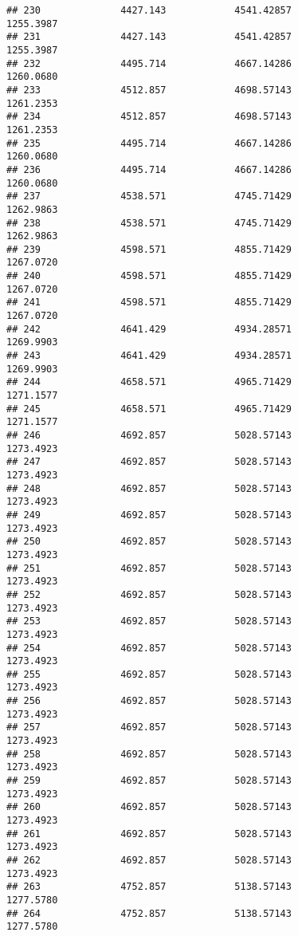 \documentclass[]{article}
\begin{document}
\begin{verbatim}
## 230              4427.143            4541.42857                1255.3987
## 231              4427.143            4541.42857                1255.3987
## 232              4495.714            4667.14286                1260.0680
## 233              4512.857            4698.57143                1261.2353
## 234              4512.857            4698.57143                1261.2353
## 235              4495.714            4667.14286                1260.0680
## 236              4495.714            4667.14286                1260.0680
## 237              4538.571            4745.71429                1262.9863
## 238              4538.571            4745.71429                1262.9863
## 239              4598.571            4855.71429                1267.0720
## 240              4598.571            4855.71429                1267.0720
## 241              4598.571            4855.71429                1267.0720
## 242              4641.429            4934.28571                1269.9903
## 243              4641.429            4934.28571                1269.9903
## 244              4658.571            4965.71429                1271.1577
## 245              4658.571            4965.71429                1271.1577
## 246              4692.857            5028.57143                1273.4923
## 247              4692.857            5028.57143                1273.4923
## 248              4692.857            5028.57143                1273.4923
## 249              4692.857            5028.57143                1273.4923
## 250              4692.857            5028.57143                1273.4923
## 251              4692.857            5028.57143                1273.4923
## 252              4692.857            5028.57143                1273.4923
## 253              4692.857            5028.57143                1273.4923
## 254              4692.857            5028.57143                1273.4923
## 255              4692.857            5028.57143                1273.4923
## 256              4692.857            5028.57143                1273.4923
## 257              4692.857            5028.57143                1273.4923
## 258              4692.857            5028.57143                1273.4923
## 259              4692.857            5028.57143                1273.4923
## 260              4692.857            5028.57143                1273.4923
## 261              4692.857            5028.57143                1273.4923
## 262              4692.857            5028.57143                1273.4923
## 263              4752.857            5138.57143                1277.5780
## 264              4752.857            5138.57143                1277.5780

\end{verbatim}
\end{document}
